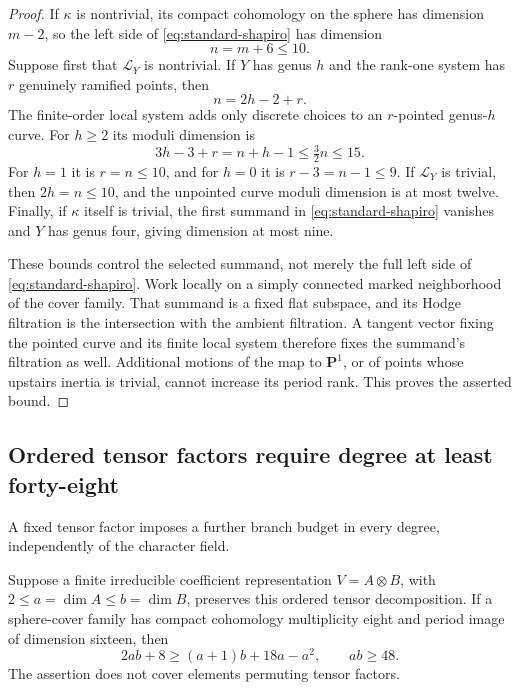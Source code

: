 \begin{proof}
If $\kappa$ is nontrivial, its compact cohomology on the sphere has
dimension $m-2$, so the left side of
\eqref{eq:standard-shapiro} has dimension
\[
 n=m+6\le10.
\]
Suppose first that $\mathcal L_Y$ is nontrivial. If $Y$ has genus
$h$ and the rank-one system has $r$ genuinely ramified points, then
\[
 n=2h-2+r.
\]
The finite-order local system adds only discrete choices to an
$r$-pointed genus-$h$ curve. For $h\ge2$ its moduli dimension is
\[
 3h-3+r=n+h-1\le\tfrac32 n\le15.
\]
For $h=1$ it is $r=n\le10$, and for $h=0$ it is
$r-3=n-1\le9$. If $\mathcal L_Y$ is trivial, then $2h=n\le10$,
and the unpointed curve moduli dimension is at most twelve.
Finally, if $\kappa$ itself is trivial, the first summand in
\eqref{eq:standard-shapiro} vanishes and $Y$ has genus four,
giving dimension at most nine.

These bounds control the selected summand, not merely the full
left side of \eqref{eq:standard-shapiro}. Work locally on a simply
connected marked neighborhood of the cover family. That summand
is a fixed flat subspace, and its Hodge filtration is the intersection
with the ambient filtration. A tangent vector fixing the pointed
curve and its finite local system therefore fixes the summand's
filtration as well. Additional motions of the map to $\mathbf P^1$,
or of points whose upstairs inertia is trivial, cannot increase
its period rank. This proves the asserted bound.
\end{proof}

\subsection{Ordered tensor factors require degree at least forty-eight}

A fixed tensor factor imposes a further branch budget in every degree,
independently of the character field.

\begin{proposition}\label{prop:ordered-tensor48}
Suppose a finite irreducible coefficient representation
$V=A\otimes B$, with $2\le a=\dim A\le b=\dim B$, preserves this
ordered tensor decomposition.  If a sphere-cover family has compact
cohomology multiplicity eight and period image of dimension sixteen,
then
\[
 2ab+8\ge(a+1)b+18a-a^2,\qquad ab\ge48.
\]
The assertion does not cover elements permuting tensor factors.
\end{proposition}

